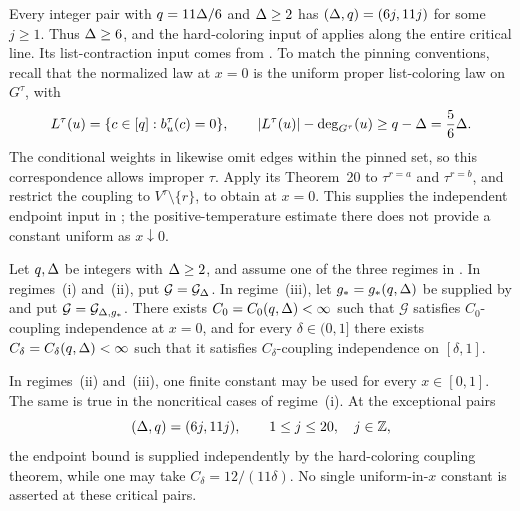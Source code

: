 \begin{remark}
\label{rem:critical-scope}
Every integer pair with \(q=11\Delta/6\) and \(\Delta\ge2\) has
\((\Delta,q)=(6j,11j)\) for some \(j\ge1\).  Thus \(\Delta\ge6\), and
the hard-coloring input of
\cite[Theorem~20 and Proposition~22]{CFFGZZ2024} applies along the
entire critical line.  Its list-contraction input comes from
\cite[Section~6 and Appendix~E]{CDMPP2019}.
To match the pinning conventions, recall that the normalized law at
\(x=0\) is the uniform proper list-coloring law on \(G^\tau\), with
\[
  L^{\tau}(u)=\{c\in[q]:b_u^\tau(c)=0\},
  \qquad
  |L^{\tau}(u)|-\deg_{G^\tau}(u)
  \ge q-\Delta=\frac56\Delta.
\]
The conditional weights in \cite[Section~2]{CFFGZZ2024} likewise omit
edges within the pinned set, so this correspondence allows improper
\(\tau\).  Apply its Theorem~20 to \(\tau^{r=a}\) and
\(\tau^{r=b}\), and restrict the coupling to
\(V^\tau\setminus\{r\}\), to obtain  at \(x=0\).
This supplies the independent endpoint input in
; the positive-temperature estimate there
does not provide a constant uniform as \(x\downarrow0\).
\end{remark}

\begin{theorem}
\label{thm:potts-ci-regimes}
Let \(q,\Delta\) be integers with \(\Delta\ge2\), and assume one of the three
regimes in .  In
regimes~\textup{(i)} and~\textup{(ii)}, put \(\mathcal G=\mathcal{G}_{\Delta}\).  In
regime~\textup{(iii)}, let \(g_*=g_*(q,\Delta)\) be supplied by
 and put \(\mathcal G=\mathcal{G}_{\Delta,g_*}\).
There exists \(C_0=C_0(q,\Delta)<\infty\) such that \(\mathcal G\)
satisfies \(C_0\)-coupling independence at \(x=0\), and for every
\(\delta\in(0,1]\) there exists \(C_\delta=C_\delta(q,\Delta)<\infty\)
such that it satisfies \(C_\delta\)-coupling independence on
\([\delta,1]\).

In regimes~\textup{(ii)} and~\textup{(iii)}, one finite constant may be
used for every \(x\in[0,1]\).  The same is true in the noncritical cases
of regime~\textup{(i)}.  At the exceptional pairs
\[
  (\Delta,q)=(6j,11j),\qquad 1\le j\le20,\quad j\in\mathbb Z,
\]
the endpoint bound is supplied independently by the hard-coloring
coupling theorem, while one may take
\(C_\delta=12/(11\delta)\).  No single uniform-in-\(x\) constant is
asserted at these critical pairs.
\end{theorem}

